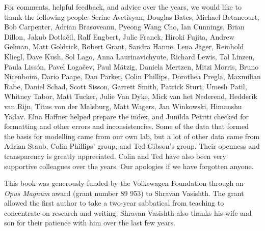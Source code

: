 For comments, helpful feedback, and advice over the years, we would like to thank the following people: 
Serine Avetisyan,
Douglas Bates, 
Michael Betancourt, 
Bob Carpenter, 
Adrian Brasoveanu, 
Pyeong Wang Cho,
Ian Cunnings,
Brian Dillon,
Jakub Dotla\v cil,
Ralf Engbert, 
Julie Franck,
Hiroki Fujita, 
Andrew Gelman, 
Matt Goldrick,
Robert Grant,
Sandra Hanne,
Lena J\"ager,
Reinhold Kliegl, 
Dave Kush,
Sol Lago,
Anna Laurinavichyute,
Richard Lewis, 
Tal Linzen, 
Paula Liss\'on,
Pavel Loga{\v c}ev,
Paul M\"atzig,
Daniela Mertzen,
Mitzi Morris, 
Bruno Nicenboim,
Dario Paape,
Dan Parker,
Colin Phillips,
Dorothea Pregla,
Maxmilian Rabe, 
Daniel Schad,
Scott Sisson, 
Garrett Smith,
Patrick Sturt,
Umesh Patil,
Whitney Tabor,
Matt Tucker,
Julie Van Dyke,
Mick van het Nederend,
Hedderik van Rijn,
Titus von der Malsburg,
Matt Wagers,
Jan Winkowski,
Himanshu Yadav. Elna Haffner helped prepare the index, and Junilda Petriti checked for formatting and other errors and inconsistencies. 
Some of the data that formed the basis for modelling came from our own lab, but a lot of other data came from Adrian Staub, Colin Phillips' group, and Ted Gibson's group. Their openness and transparency is greatly appreciated. Colin and Ted have also been very supportive colleagues over the years. Our apologies if we have forgotten anyone.

This book was generously funded by the Volkswagen Foundation through an \textit{Opus Magnum} award (grant number 89 953) to Shravan Vasishth. The grant  allowed the first author to take a two-year sabbatical from teaching to concentrate on research and writing. Shravan Vasishth also thanks his wife and son for their patience  with him over the last few years.
